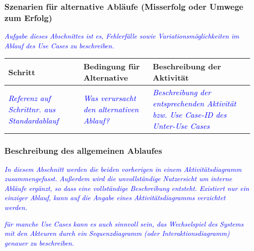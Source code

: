\subsubsection*{Szenarien für alternative Abläufe (Misserfolg oder Umwege zum Erfolg)}
\textcolor{blue}{\textit{Aufgabe dieses Abschnittes ist es, Fehlerfälle sowie Variationsmöglichkeiten im Ablauf des Use Cases zu beschreiben.}}

\begin{table}[H]
    \begin{tabularx}{\textwidth}{| X | X | X |} 
	\hline    
    \textbf{Schritt} & \textbf{Bedingung für Alternative} & \textbf{Beschreibung der Aktivität} \\ \hline
    \textcolor{blue}{\textit{Referenz auf Schrittnr. aus Standardablauf}} & \textcolor{blue}{\textit{Was verursacht den alternativen Ablauf?}} & \textcolor{blue}{\textit{Beschreibung der entsprechenden Aktivität bzw. Use Case-ID des Unter-Use Cases}} \\ \hline
    \end{tabularx}
\end{table}

\subsubsection*{Beschreibung des allgemeinen Ablaufes}
\textcolor{blue}{\textit{In diesem Abschnitt werden die beiden vorherigen in einem Aktivitätsdiagramm zusammengefasst. Außerdem wird die unvollständige Nutzersicht um interne Abläufe ergänzt, so dass eine vollständige Beschreibung entsteht. Existiert nur ein einziger Ablauf, kann auf die Angabe eines Aktivitätsdiagramms verzichtet werden.}}

\textcolor{blue}{\textit{für manche Use Cases kann es auch sinnvoll sein, das Wechselspiel des Systems mit den Akteuren durch ein Sequenzdiagramm (oder Interaktionsdiagramm) genauer zu beschreiben.}}